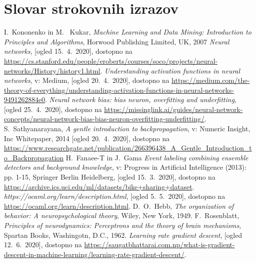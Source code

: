 \documentclass[mat1]{fmfdelo}
\begin{document}
\section*{Slovar strokovnih izrazov}
%


\begin{thebibliography}{99}
%
I.~Kononenko in M.~ Kukar, \emph{Machine Learning and Data Mining: Introduction to Principles and Algorithms}, Horwood Publishing Limited, UK, 2007
%
\emph{Neural networks}, [ogled 15.~4.~2020], dostopno na \url{https://cs.stanford.edu/people/eroberts/courses/soco/projects/neural-networks/History/history1.html}.
%
\emph{Understanding activation functions in neural networks}, v: Medium, [ogled 20.~4.~2020], dostopno na \url{https://medium.com/the-theory-of-everything/understanding-activation-functions-in-neural-networks-9491262884e0}.
%
\emph{Neural network bias: bias neuron, overfitting and underfitting}, [ogled 25.~4.~2020], dostopno na \url{https://missinglink.ai/guides/neural-network-concepts/neural-network-bias-bias-neuron-overfitting-underfitting/}.
%
S.~Sathyanarayana, \emph{A gentle introduction to backpropagation}, v: Numeric Insight, Inc Whitepaper, 2014 [ogled 20.~4.~2020], dostopno na \url{https://www.researchgate.net/publication/266396438_A_Gentle_Introduction_to_Backpropagation}
%
H.~Fanaee-T in J.~Gama \emph{Event labeling combining ensemble detectors and background knowledge}, v:  Progress in Artificial Intelligence (2013): pp. 1-15, Springer Berlin Heidelberg, [ogled 15.~3.~2020], dostopno na \url{https://archive.ics.uci.edu/ml/datasets/bike+sharing+dataset}.
%
 \emph{https://ocaml.org/learn/description.html}, [ogled 5.~5.~2020], dostopno na \url{https://ocaml.org/learn/description.html}.
%
D.~O.~Hebb, \emph{The organization of behavior: A neuropsychological theory}, Wiley, New York, 1949.
%
F.~Rosenblatt, \emph{Principles of neurodynamics: Perceptrons and the theory of brain mechanisms}, Spartan Books,  Washingotn, D.C., 1962.
%
\emph{Learning rate gradient descent}, [ogled 12.~6.~2020], dostopno na \url{https://saugatbhattarai.com.np/what-is-gradient-descent-in-machine-learning/learning-rate-gradient-descent/}.
\end{thebibliography}
\end{document}
